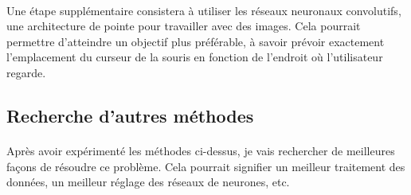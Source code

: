 \paragraph{}
Une étape supplémentaire consistera à utiliser les réseaux neuronaux convolutifs, une architecture de pointe pour travailler avec des images.
Cela pourrait permettre d'atteindre un objectif plus préférable, à savoir prévoir exactement l'emplacement du curseur de la souris en fonction de l'endroit où l'utilisateur regarde.

\subsection{Recherche d'autres méthodes}
\paragraph{}
Après avoir expérimenté les méthodes ci-dessus, je vais rechercher de meilleures façons de résoudre ce problème.
Cela pourrait signifier un meilleur traitement des données, un meilleur réglage des réseaux de neurones, etc.
